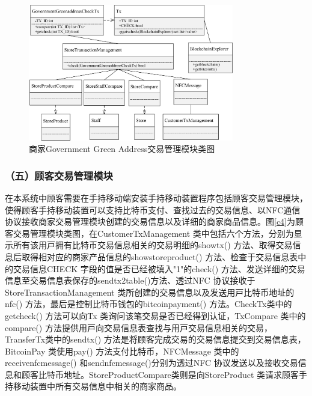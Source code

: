 	

	\begin{figure}[!htbp]
		\centering
		\includegraphics[width = 0.8\textwidth]{c7.jpg}
		\caption{商家Government Green Address交易管理模块类图}\label{c7}
	\end{figure}



\subsubsection{（五）顾客交易管理模块}
在本系统中顾客需要在手持移动端安装手持移动装置程序包括顾客交易管理模块，使得顾客手持移动装置可以支持比特币支付、查找过去的交易信息、以NFC通信协议接收商家交易管理模块创建的交易信息以及详细的商家商品信息。图\ref{c4}为顾客交易管理模块类图，在CustomerTxManagement 类中包括六个⽅法，分别为显⽰所有该⽤⼾拥有⽐特币交易信息相关的交易明细的showtx() ⽅法、取得交易信息后取得相对应的商家产品信息的showstoreproduct() ⽅法、检查于交易信息表中的交易信息CHECK 字段的值是否已经被填⼊"1"的check() ⽅法、发送详细的交易信息⾄交易信息表保存的sendtx2table()⽅法、透过NFC 协议接收于StoreTransactionManagement 类所创建的交易信息以及发送⽤⼾⽐特币地址的nfc() ⽅法，最后是控制⽐特币钱包的bitcoinpayment() ⽅法。CheckTx类中的getcheck() ⽅法可以向Tx 类询问该笔交易是否已经得到认证，TxCompare 类中的compare() ⽅法提供⽤⼾向交易信息表查找与⽤⼾交易信息相关的交易，TransferTx类中的sendtx() ⽅法是将顾客完成交易的交易信息提交到交易信息表，BitcoinPay 类使⽤pay() ⽅法⽀付⽐特币，NFCMessage 类中的receivenfcmessage() 和sendnfcmessage()分别为透过NFC 协议发送以及接收交易信息和顾客⽐特币地址。StoreProductCompare类则是向StoreProduct 类请求顾客手持移动装置中所有交易信息中相关的商家商品。


